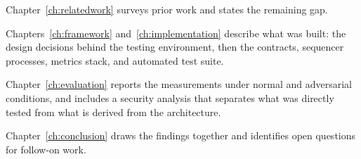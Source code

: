 Chapter~\ref{ch:relatedwork} surveys prior work and states the remaining gap.

Chapters~\ref{ch:framework} and~\ref{ch:implementation} describe what was built: the design decisions behind the testing environment, then the contracts, sequencer processes, metrics stack, and automated test suite.

Chapter~\ref{ch:evaluation} reports the measurements under normal and adversarial conditions, and includes a security analysis that separates what was directly tested from what is derived from the architecture.

Chapter~\ref{ch:conclusion} draws the findings together and identifies open questions for follow-on work.
